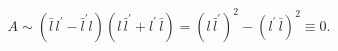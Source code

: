 \begin{equation*}
A\sim (\bar{l}\,l^{\prime }-\bar{l}^{\prime }l)(l\,\bar{l}^{\prime
}+l^{\prime }\,\bar{l})=(l\,\bar{l}^{\prime })^{2}-(l^{\prime }\,\bar{l}%
)^{2}\equiv 0.
\end{equation*}

